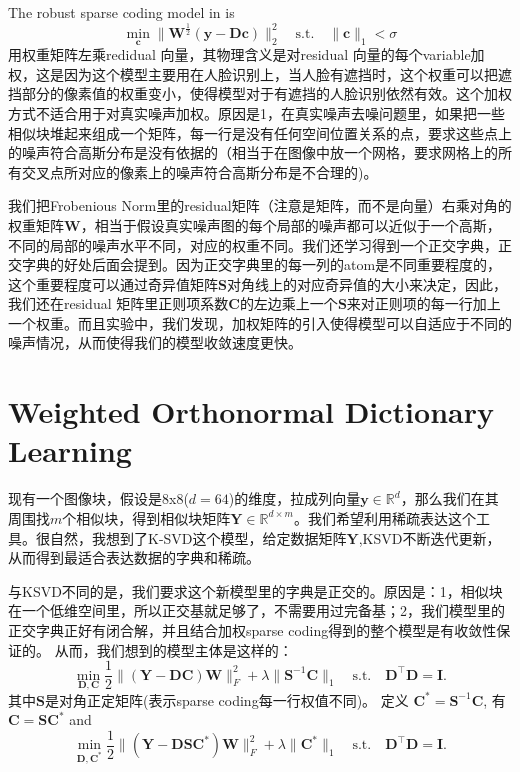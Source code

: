 \documentclass[10pt,twocolumn,letterpaper]{article}
\begin{document}
The robust sparse coding model in \cite{yang2011robust} is 
\begin{equation}
\min_{\mathbf{c}}\|\mathbf{W}^{\frac{1}{2}}(\mathbf{y}-\mathbf{D}\mathbf{c})\|_{2}^{2}
\quad
\text{s.t.}
\quad
\|\mathbf{c}\|_{1}<\sigma
\end{equation}
用权重矩阵左乘redidual 向量，其物理含义是对residual 向量的每个variable加权，这是因为这个模型主要用在人脸识别上，当人脸有遮挡时，这个权重可以把遮挡部分的像素值的权重变小，使得模型对于有遮挡的人脸识别依然有效。这个加权方式不适合用于对真实噪声加权。原因是1，在真实噪声去噪问题里，如果把一些相似块堆起来组成一个矩阵，每一行是没有任何空间位置关系的点，要求这些点上的噪声符合高斯分布是没有依据的（相当于在图像中放一个网格，要求网格上的所有交叉点所对应的像素上的噪声符合高斯分布是不合理的)。

我们把Frobenious Norm里的residual矩阵（注意是矩阵，而不是向量）右乘对角的权重矩阵$\mathbf{W}$，相当于假设真实噪声图的每个局部的噪声都可以近似于一个高斯，不同的局部的噪声水平不同，对应的权重不同。我们还学习得到一个正交字典，正交字典的好处后面会提到。因为正交字典里的每一列的atom是不同重要程度的，这个重要程度可以通过奇异值矩阵$\mathbf{S}$对角线上的对应奇异值的大小来决定，因此，我们还在residual 矩阵里正则项系数$\mathbf{C}$的左边乘上一个$\mathbf{S}$来对正则项的每一行加上一个权重。而且实验中，我们发现，加权矩阵的引入使得模型可以自适应于不同的噪声情况，从而使得我们的模型收敛速度更快。

\section{Weighted Orthonormal Dictionary Learning}
现有一个图像块，假设是8x8($d=64$)的维度，拉成列向量$\mathbf{y}\in\mathbb{R}^{d}$，那么我们在其周围找$m$个相似块，得到相似块矩阵$\mathbf{Y}\in\mathbb{R}^{d\times m}$。我们希望利用稀疏表达这个工具。很自然，我想到了K-SVD这个模型，给定数据矩阵$\mathbf{Y}$,KSVD不断迭代更新，从而得到最适合表达数据的字典和稀疏。

与KSVD不同的是，我们要求这个新模型里的字典是正交的。原因是：1，相似块在一个低维空间里，所以正交基就足够了，不需要用过完备基；2，我们模型里的正交字典正好有闭合解，并且结合加权sparse coding得到的整个模型是有收敛性保证的。
从而，我们想到的模型主体是这样的：
\begin{equation}\label{wlswsc}
\min_{\mathbf{D},\mathbf{C}}\frac{1}{2}\|(\mathbf{Y}-\mathbf{D}\mathbf{C})\mathbf{W}\|_{F}^{2}
+
\lambda\|\mathbf{S}^{-1}\mathbf{C}\|_{1}
\quad
\text{s.t.}
\quad
\mathbf{D}^{\top}\mathbf{D} =\mathbf{I}. 
\end{equation}
其中$\mathbf{S}$是对角正定矩阵(表示sparse coding每一行权值不同)。
定义 $\mathbf{C}^{*}=\mathbf{S}^{-1}\mathbf{C}$, 有$\mathbf{C}=\mathbf{S}\mathbf{C}^{*}$ and 
\begin{equation}
\min_{\mathbf{D},\mathbf{C}^{*}}\frac{1}{2}\|(\mathbf{Y}-\mathbf{D}\mathbf{S}\mathbf{C}^{*})\mathbf{W}\|_{F}^{2} 
+
\lambda\|\mathbf{C}^{*}\|_{1}
\quad
\text{s.t.}
\quad
\mathbf{D}^{\top}\mathbf{D} = \mathbf{I}.
\end{equation}
\end{document}
